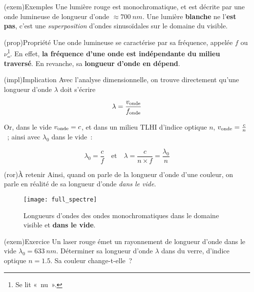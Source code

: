 \documentclass[../../main/main.tex]{subfiles}
\begin{document}
\begin{tcb}(exem){Exemples}
	Une lumière rouge est monochromatique, et est décrite par une onde lumineuse
	de longueur d'onde $\approx \SI{700}{nm}$. Une lumière \textbf{blanche} ne
	l'\textbf{est pas}, c'est une \textit{superposition} d'ondes sinusoïdales sur
	le domaine du visible.
\end{tcb}

\begin{tcb}(prop){Propriété}
	Une onde lumineuse se caractérise par sa fréquence, appelée $f$ ou
	$\nu$\footnote{Se lit «~nu~».}. En effet, \textbf{la fréquence d'une
		onde est indépendante du milieu traversé}. En revanche, sa
	\textbf{longueur d'onde en dépend}.
\end{tcb}

\begin{tcb}(impl){Implication}
	Avec l'analyse dimensionnelle, on trouve directement qu'une longueur
	d'onde $\lambda$ doit s'écrire

	\[\lambda = \frac{v_{\rm onde}}{f_{\rm onde}}\]

	Or, dans le vide $v_{\rm onde} = c$, et dans un milieu TLHI d'indice
	optique $n$, $v_{\rm onde} = \frac{c}{n}$~; ainsi avec $\lambda_0$ dans
	le vide~:

	\begin{equation*}
		\boxed{\lambda_0 = \frac{c}{f}}
		\quad\text{et}\quad
		\boxed{\lambda = \frac{c}{n\times f} = \frac{\lambda_0}{n}}
	\end{equation*}
\end{tcb}

\begin{tcb}(ror){À retenir}
	Ainsi, quand on parle de la longueur d'onde d'une couleur, on parle en réalité
	de sa longueur d'onde \textit{dans le vide}.
\end{tcb}

\begin{figure}[h]
	\centering
	\texttt{[image: full\_spectre]}
	\caption{Longueurs d'ondes des ondes monochromatiques dans le domaine
		visible et \textbf{dans le vide}.}
	\label{fig:lambda_vis}
\end{figure}

\begin{tcb}(exem){Exercice}
	Un laser rouge émet un rayonnement de longueur d'onde dans le vide
	$\lambda_0 = \SI{633}{nm}$. Déterminer sa longueur d'onde $\lambda$ dans du
	verre, d'indice optique $n = \num{1.5}$. Sa couleur change-t-elle~?
	\tcblower

\end{tcb}
\end{document}
